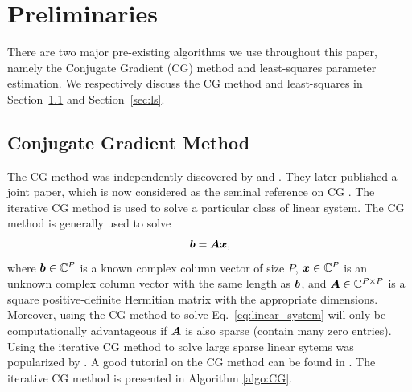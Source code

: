 \documentclass[useAMS,usenatbib]{mn2e}
\newcommand{\bA}{\bmath{A}}
\newcommand{\bb}{\bmath{b}}
\newcommand{\bx}{\bmath{x}}
\begin{document}
%  
 
\section{Preliminaries}
There are two major pre-existing algorithms we use throughout this paper, namely the Conjugate Gradient (CG) method and least-squares parameter estimation.
We respectively discuss the CG method and least-squares in Section~\ref{sec:conj_grad} and Section~\ref{sec:ls}.

\subsection{Conjugate Gradient Method}
\label{sec:conj_grad}
The CG method was independently discovered by \citet{Hestenes1973} and \citet{Stiefel1952}. They later published a joint paper, which is now considered as the seminal
reference on CG \citep{Hestenes1952}. The iterative CG method is used to solve a particular class of linear system. The CG method is generally used to solve
\begin{equation}
\label{eq:linear_system}
\bb = \bA\bx,
\end{equation}
where $\bb\in\mathbb{C}^P$ is a known complex column vector of size $P$, $\bx\in\mathbb{C}^P$ is an unknown complex column vector with the same length as $\bb$, and $\bA\in\mathbb{C}^{P\times P}$ is a square positive-definite Hermitian matrix with the appropriate dimensions.  
Moreover, using the CG method to solve Eq.~\eqref{eq:linear_system} will only be computationally advantageous if $\bA$ is also sparse (contain many zero entries).
Using the iterative CG method to solve large sparse linear sytems was popularized by \citet{Reid1971}. A good tutorial on the CG method can be found in \citep{Shewchuk1994}.
The iterative CG method is presented in Algorithm \ref{algo:CG}. 
\end{document}
